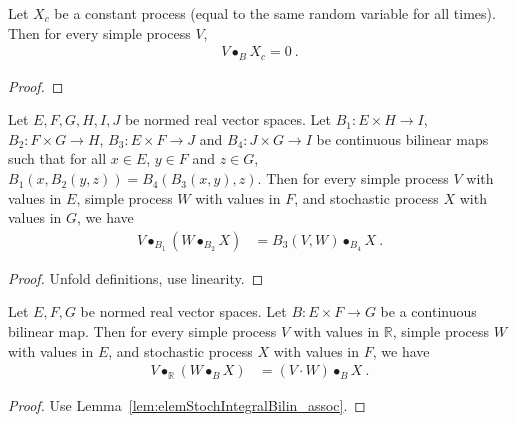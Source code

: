 \begin{lemma}\label{lem:elemStochIntegralBilin_const}
  \leanok
Let $X_c$ be a constant process (equal to the same random variable for all times).
Then for every simple process $V$,
\begin{align*}
  V \bullet_B X_c = 0
  \: .
\end{align*}
\end{lemma}

\begin{proof}
  \leanok
\end{proof}


\begin{lemma}\label{lem:elemStochIntegralBilin_assoc}
  \leanok
Let $E, F, G, H, I, J$ be normed real vector spaces.
Let $B_1 : E \times H \to I$, $B_2 : F \times G \to H$, $B_3 : E \times F \to J$ and $B_4 : J \times G \to I$ be continuous bilinear maps such that for all $x \in E$, $y \in F$ and $z \in G$, $B_1(x, B_2(y, z)) = B_4(B_3(x, y), z)$.
Then for every simple process $V$ with values in $E$, simple process $W$ with values in $F$, and stochastic process $X$ with values in $G$, we have
\begin{align*}
  V \bullet_{B_1} (W \bullet_{B_2} X)
  &= B_3(V, W) \bullet_{B_4} X
  \: .
\end{align*}
\end{lemma}

\begin{proof}
  \leanok
Unfold definitions, use linearity.
\end{proof}


\begin{corollary}\label{cor:elemStochIntegral_assoc_real_bilin}
Let $E, F, G$ be normed real vector spaces.
Let $B : E \times F \to G$ be a continuous bilinear map.
Then for every simple process $V$ with values in $\mathbb{R}$, simple process $W$ with values in $E$, and stochastic process $X$ with values in $F$, we have
\begin{align*}
  V \bullet_{\mathbb{R}} (W \bullet_{B} X)
  &= (V \cdot W) \bullet_{B} X
  \: .
\end{align*}
\end{corollary}

\begin{proof}
Use Lemma~\ref{lem:elemStochIntegralBilin_assoc}.
\end{proof}


